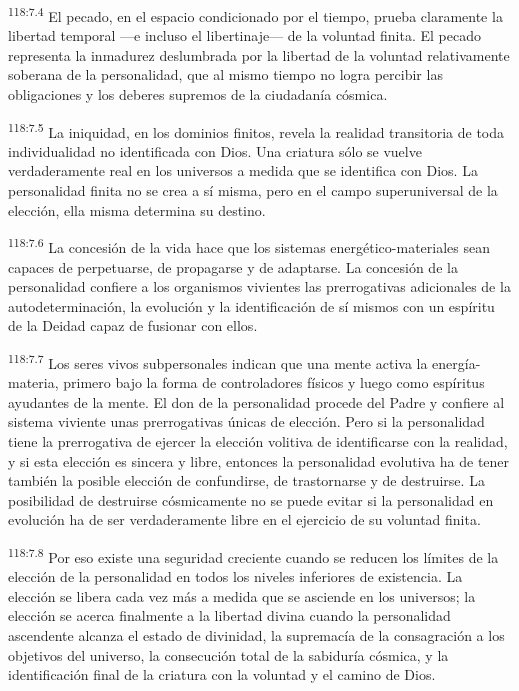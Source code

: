 \par
\textsuperscript{118:7.4} El pecado, en el espacio condicionado por el tiempo, prueba claramente la libertad temporal ---e incluso el libertinaje--- de la voluntad finita. El pecado representa la inmadurez deslumbrada por la libertad de la voluntad relativamente soberana de la personalidad, que al mismo tiempo no logra percibir las obligaciones y los deberes supremos de la ciudadanía cósmica.

\par
\textsuperscript{118:7.5} La iniquidad, en los dominios finitos, revela la realidad transitoria de toda individualidad no identificada con Dios. Una criatura sólo se vuelve verdaderamente real en los universos a medida que se identifica con Dios. La personalidad finita no se crea a sí misma, pero en el campo superuniversal de la elección, ella misma determina su destino.

\par
\textsuperscript{118:7.6} La concesión de la vida hace que los sistemas energético-materiales sean capaces de perpetuarse, de propagarse y de adaptarse. La concesión de la personalidad confiere a los organismos vivientes las prerrogativas adicionales de la autodeterminación, la evolución y la identificación de sí mismos con un espíritu de la Deidad capaz de fusionar con ellos.

\par
\textsuperscript{118:7.7} Los seres vivos subpersonales indican que una mente activa la energía-materia, primero bajo la forma de controladores físicos y luego como espíritus ayudantes de la mente. El don de la personalidad procede del Padre y confiere al sistema viviente unas prerrogativas únicas de elección. Pero si la personalidad tiene la prerrogativa de ejercer la elección volitiva de identificarse con la realidad, y si esta elección es sincera y libre, entonces la personalidad evolutiva ha de tener también la posible elección de confundirse, de trastornarse y de destruirse. La posibilidad de destruirse cósmicamente no se puede evitar si la personalidad en evolución ha de ser verdaderamente libre en el ejercicio de su voluntad finita.

\par
\textsuperscript{118:7.8} Por eso existe una seguridad creciente cuando se reducen los límites de la elección de la personalidad en todos los niveles inferiores de existencia. La elección se libera cada vez más a medida que se asciende en los universos; la elección se acerca finalmente a la libertad divina cuando la personalidad ascendente alcanza el estado de divinidad, la supremacía de la consagración a los objetivos del universo, la consecución total de la sabiduría cósmica, y la identificación final de la criatura con la voluntad y el camino de Dios.

